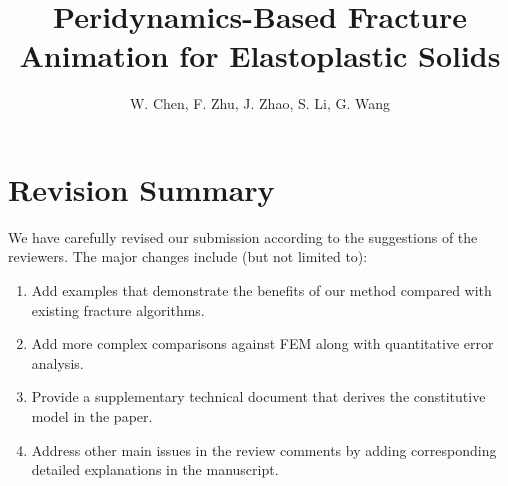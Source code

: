 

\title[Peridynamics-Based Fracture Animation for Elastoplastic Solids]%
      {Peridynamics-Based Fracture Animation for Elastoplastic Solids}

\author[W. Chen et al.]{W. Chen, F. Zhu, J. Zhao,
  S. Li, G. Wang}



%



\maketitle

\section{Revision Summary}

We have carefully revised our submission according to the suggestions of the reviewers. The major changes include (but not limited to):
\begin{enumerate}
\item{Add examples that demonstrate the benefits of our method compared with existing fracture algorithms.}
\item{Add more complex comparisons against FEM along with quantitative error analysis.}
\item{Provide a supplementary technical document that derives the constitutive model in the paper.}
\item{Address other main issues in the review comments by adding corresponding detailed explanations in the manuscript.}
\end{enumerate}

